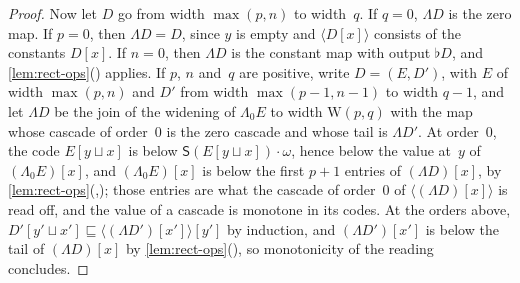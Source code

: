 \documentclass[11pt]{amsart}
\newcommand{\bS}{\mathsf{S}}
\newcommand{\btimes}{\mathbin{\cdot}}
\newcommand{\W}{\mathrm{W}}
\newcommand{\tle}{\mathrel{\sqsubseteq}}      %
\newcommand{\act}[2]{#1[#2]}                  %
\newcommand{\rd}[1]{\langle #1 \rangle}       %
\theoremstyle{plain}
\theoremstyle{definition}
\begin{document}
\begin{proof}
Now let $D$ go from width $\max(p,n)$ to width~$q$. If $q = 0$,
$\Lambda D$ is the zero map. If $p = 0$, then $\Lambda D = D$, since
$y$ is empty and $\rd{\act D x}$ consists of the constants
$\act D x$. If $n = 0$, then $\Lambda D$ is the constant map with
output $\flat D$, and \cref{lem:rect-ops}()
applies. If $p$, $n$ and~$q$ are positive, write $D = (E, D')$, with
$E$ of width $\max(p,n)$ and $D'$ from width $\max(p-1,n-1)$ to width
$q-1$, and let $\Lambda D$ be the join of the widening of
$\Lambda_0 E$ to width $\W(p,q)$ with the map whose cascade of
order~$0$ is the zero cascade and whose tail is $\Lambda D'$. At
order~$0$, the code $\act{E}{y \sqcup x}$ is below
$\bS(\act{E}{y \sqcup x}) \btimes \omega$, hence below the value at~$y$
of $\act{(\Lambda_0 E)}{x}$, and $\act{(\Lambda_0 E)}{x}$ is below the
first $p+1$ entries of $\act{(\Lambda D)}{x}$, by
\cref{lem:rect-ops}(,);
those entries are what the cascade of order~$0$ of
$\rd{\act{(\Lambda D)}{x}}$ is read off, and the value of a cascade is
monotone in its codes. At the orders above,
$\act{D'}{y' \sqcup x'} \tle \act{\rd{\act{(\Lambda D')}{x'}}}{y'}$
by induction, and $\act{(\Lambda D')}{x'}$ is below the tail of
$\act{(\Lambda D)}{x}$ by
\cref{lem:rect-ops}(), so monotonicity of the
reading concludes.


\end{proof}
\end{document}
